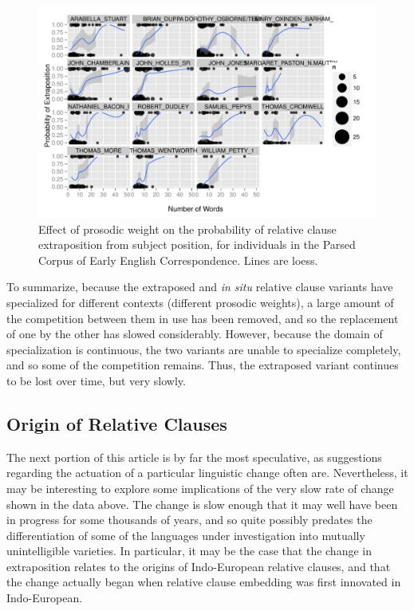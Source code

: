 
\begin{figure}
  \includegraphics[width=1.1\textwidth]{stableVarTalks/exSbjWeightLoess.pdf}
\caption{Effect of prosodic weight on the probability of relative clause extraposition from subject position, for individuals in the Parsed Corpus of Early English Correspondence. Lines are loess.}
\label{pceecWeight}       
\end{figure}

To summarize, because the extraposed and \textsl{in situ} relative clause variants have specialized for different contexts (different prosodic weights), a large amount of the competition between them in use has been removed, and so the replacement of one by the other has slowed considerably. However, because the domain of specialization is continuous, the two variants are unable to specialize completely, and so some of the competition remains. Thus, the extraposed variant continues to be lost over time, but very slowly.

\subsection{Origin of Relative Clauses}
\label{pie}

The next portion of this article is by far the most speculative, as suggestions regarding the actuation of a particular linguistic change often are. Nevertheless, it may be interesting to explore some implications of the very slow rate of change shown in the data above. The change is slow enough that it may well have been in progress for some thousands of years, and so quite possibly predates the differentiation of some of the languages under investigation into mutually unintelligible varieties. In particular, it may be the case that the change in extraposition relates to the origins of Indo-European relative clauses, and that the change actually began when relative clause embedding was first innovated in Indo-European.

